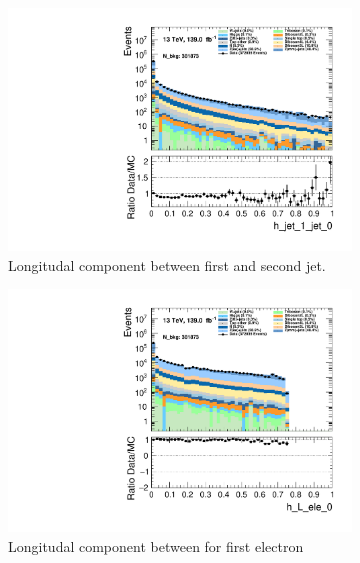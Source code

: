 \begin{figure}
    \centering
    \begin{subfigure}{.49\textwidth}
        \includegraphics[width=\textwidth]{Figures/MC_Data_comp/h_jet_1_jet_0.pdf}
        \caption{Longitudal component between first and second jet.}
        \label{fig:h_jet_1_jet_0}
    \end{subfigure}
    \hfill
    \begin{subfigure}{.49\textwidth}
        \includegraphics[width=\textwidth]{Figures/MC_Data_comp/h_L_ele_0.pdf}
        \caption{ Longitudal component between for first electron}
        \label{fig:h_L_ele_0}
    \end{subfigure}
    \hfill 
    \begin{subfigure}{.49\textwidth}

\end{subfigure}
\end{figure}
